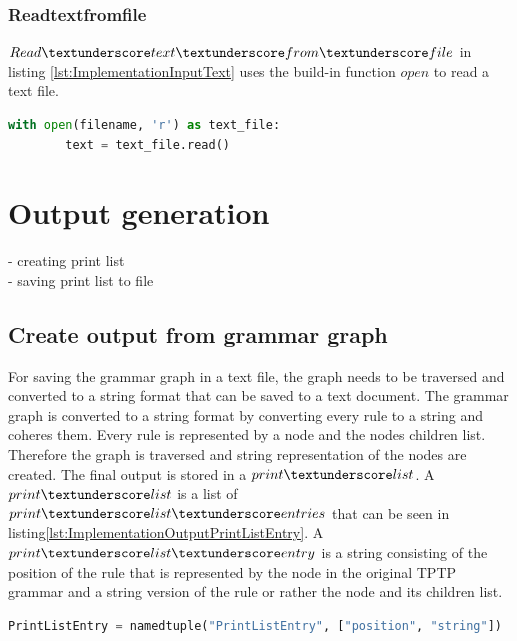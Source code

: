 \subsubsection{Read\textunderscore text\textunderscore from\textunderscore file}

$Read\textunderscore text\textunderscore from\textunderscore file$ in listing \ref{lst:ImplementationInputText} uses the build-in function $open$ to read a text file. \\

\begin{lstlisting}[language=Python, basicstyle=\scriptsize	,caption= Read text from file,label= lst:ImplementationInputText]
with open(filename, 'r') as text_file:
        text = text_file.read()
\end{lstlisting}

\section{Output generation}\label{sec:ImplementationOutputGeneration}

- creating print list\\ 
- saving print list to file

\subsection{Create output from grammar graph}\label{sec:ImplementationOutputGrammarGraph}

For saving the grammar graph in a text file, the graph needs to be traversed and converted to a string format that can be saved to a text document. The grammar graph is converted to a string format by converting every rule to a string and coheres them. Every rule is represented by a node and the nodes children list. Therefore the graph is traversed and string representation of the nodes are created.
The final output is stored in a $print\textunderscore list$. A $print\textunderscore list$ is a list of $print\textunderscore list\textunderscore entries$ that can be seen in listing\ref{lst:ImplementationOutputPrintListEntry}. A $print\textunderscore list\textunderscore entry$ is a string consisting of the position of the rule that is represented by the node in the original \ac{TPTP} grammar and a string version of the rule or rather the node and its children list.

\begin{lstlisting}[language=Python, basicstyle=\scriptsize	,caption= Print List Entry,label= lst:ImplementationOutputPrintListEntry]
PrintListEntry = namedtuple("PrintListEntry", ["position", "string"])
\end{lstlisting}

